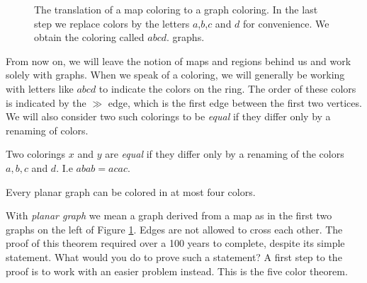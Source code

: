 \begin{figure}[!h]
    \caption{The translation of a map coloring to a graph coloring. In the last step we replace colors by the letters $a$,$b$,$c$ and $d$ for convenience. We obtain the coloring called $abcd$. graphs. }
    \label{fig:colortut}
\end{figure}

From now on, we will leave the notion of maps and regions behind us and work solely with graphs. When we speak of a coloring, we will generally be working with letters like $abcd$ to indicate the colors on the ring. The order of these colors is indicated by the $\gg$ edge, which is the first edge between the first two vertices. We will also consider two such colorings to be \textit{equal} if they differ only by a renaming of colors.

\begin{definition}
    \label{def:coleq}
    Two colorings $x$ and $y$ are \emph{equal} if they differ only by a renaming of the colors $a,b,c$ and $d$. I.e $abab = acac$.
\end{definition}

\begin{theorem}
    Every planar graph can be colored in at most four colors.
\end{theorem}

With \textit{planar graph} we mean a graph derived from a map as in the first two graphs on the left of Figure \ref{fig:colortut}. Edges are not allowed to cross each other. The proof of this theorem required over a 100 years to complete, despite its simple statement. What would you do to prove such a statement? A first step to the proof is to work with an easier problem instead. This is the five color theorem.